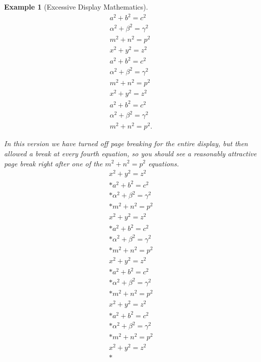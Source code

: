 \documentclass{sn-jnl}
\theoremstyle{thmstyleone}%
\theoremstyle{thmstyletwo}%
\newtheorem{example}[theorem]{Example}
\theoremstyle{thmstylethree}%
\numberwithin{equation}{section}
\begin{document}
\begin{example}[Excessive Display Mathematics]
\begin{gather*}
a^2+b^2=c^2\\
\alpha^2+\beta^2=\gamma^2\\
m^2+n^2=p^2\\
x^2+y^2=z^2\\
a^2+b^2=c^2\\
\alpha^2+\beta^2=\gamma^2\\
m^2+n^2=p^2\\
x^2+y^2=z^2\\
a^2+b^2=c^2\\
\alpha^2+\beta^2=\gamma^2\\
m^2+n^2=p^2\text{.}
\end{gather*}
%
\par
In this version we have turned off page breaking for the entire display, but then allowed a break at every fourth equation, so you should see a reasonably attractive page break right after one of the \(m^2+n^2=p^2\) equations.%
\begin{gather}
x^2+y^2=z^2\label{section-mathematics-4-9-3-2-1}\\*
a^2+b^2=c^2\label{section-mathematics-4-9-3-2-2}\\*
\alpha^2+\beta^2=\gamma^2\label{section-mathematics-4-9-3-2-3}\\*
m^2+n^2=p^2\label{section-mathematics-4-9-3-2-4}\\
x^2+y^2=z^2\label{section-mathematics-4-9-3-2-5}\\*
a^2+b^2=c^2\label{section-mathematics-4-9-3-2-6}\\*
\alpha^2+\beta^2=\gamma^2\label{section-mathematics-4-9-3-2-7}\\*
m^2+n^2=p^2\label{section-mathematics-4-9-3-2-8}\\
x^2+y^2=z^2\label{section-mathematics-4-9-3-2-9}\\*
a^2+b^2=c^2\label{section-mathematics-4-9-3-2-10}\\*
\alpha^2+\beta^2=\gamma^2\label{section-mathematics-4-9-3-2-11}\\*
m^2+n^2=p^2\label{section-mathematics-4-9-3-2-12}\\
x^2+y^2=z^2\label{section-mathematics-4-9-3-2-13}\\*
a^2+b^2=c^2\label{section-mathematics-4-9-3-2-14}\\*
\alpha^2+\beta^2=\gamma^2\label{section-mathematics-4-9-3-2-15}\\*
m^2+n^2=p^2\label{section-mathematics-4-9-3-2-16}\\
x^2+y^2=z^2\label{section-mathematics-4-9-3-2-17}\\*

\end{gather}
\end{example}
\end{document}
